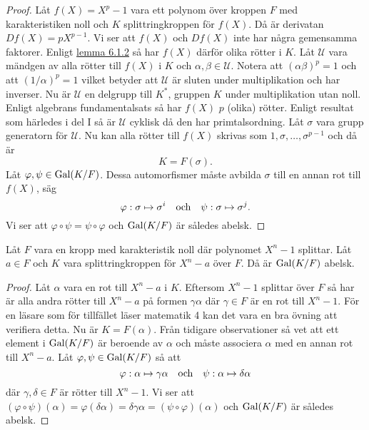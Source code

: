 \documentclass{article}
\newcommand{\gal}[0]{\textnormal{Gal}}
\theoremstyle{definition}
\begin{document}
\begin{proof}
  Låt $f(X) = X^p - 1$ vara ett polynom över kroppen $F$ med karakteristiken noll 
  och $K$ splittringkroppen för $f(X)$. Då är derivatan $Df(X) = pX^{p-1}$. Vi ser att $f(X)$ och $Df(X)$ inte har några gemensamma faktorer. Enligt 
  \hyperlink{lemma7.1.2}{lemma 6.1.2} så har $f(X)$ därför olika rötter i $K$. Låt $\mathcal{U}$ vara mändgen av alla rötter till $f(X)$ i $K$
  och $\alpha, \beta \in \mathcal{U}$. Notera att $(\alpha \beta)^p = 1$ och att $(1/\alpha)^{p} = 1$ vilket betyder att 
  $\mathcal{U}$ är sluten under multiplikation och har inverser. Nu är $\mathcal{U}$ en delgrupp till $K^*$, gruppen $K$ under multiplikation utan 
  noll. Enligt algebrans fundamentalsats så har $f(X)$ $p$ (olika) rötter. Enligt resultat som härledes i del I så är $\mathcal{U}$ 
  cyklisk då den har primtalsordning. Låt $\sigma$ vara grupp generatorn för $\mathcal{U}$. Nu kan alla rötter till $f(X)$ skrivas som 
  $1, \sigma, \ldots, \sigma^{p-1}$ och då är 
  \[K = F(\sigma).\]
  Låt $\varphi, \psi \in  \gal(K/F)$. Dessa automorfismer måste avbilda $\sigma$ till en annan rot till $f(X)$, säg 
  \[\varphi: \sigma \mapsto \sigma^i \quad \textnormal{och} \quad \psi: \sigma \mapsto \sigma^j.\]
  Vi ser att $\varphi \circ \psi = \psi \circ \varphi$ och $\gal(K/F)$ är således abelsk.
\end{proof}

\hypertarget{lemma10.0.4}{}
\begin{mylemma}{}{}
  Låt $F$ vara en kropp med karakteristik noll där polynomet $X^n - 1$ splittar. Låt $a \in F$ och $K$ vara splittringkroppen 
  för $X^n - a$ över $F$. Då är $\gal(K/F)$ abelsk.  
\end{mylemma}

\begin{proof}
  Låt $\alpha$ vara en rot till $X^n - a$ i $K$. Eftersom $X^n -1$ splittar över $F$ så har är alla andra rötter till $X^n - a$
  på formen $\gamma \alpha$ där $\gamma \in F$ är en rot till $X^n - 1$. 
  För en läsare som för tillfället läser matematik 4 kan det vara en bra övning att verifiera detta. Nu är $K = F(\alpha)$.
  Från tidigare observationer så vet att ett element i $\gal(K/F)$ är beroende av $\alpha$ och måste associera $\alpha$
  med en annan rot till $X^n - a$. Låt $\varphi, \psi \in \gal(K/F)$ så att
  \[\varphi: \alpha \mapsto \gamma \alpha \quad \textnormal{och} \quad \psi: \alpha \mapsto \delta \alpha\]
  där $\gamma, \delta \in F$ är rötter till $X^n - 1$. Vi ser att $(\varphi \circ \psi)(\alpha) = \varphi(\delta \alpha) = \delta \gamma \alpha = 
  (\psi \circ \varphi)(\alpha)$ och $\gal(K/F)$ är således abelsk.
\end{proof}
\end{document}
